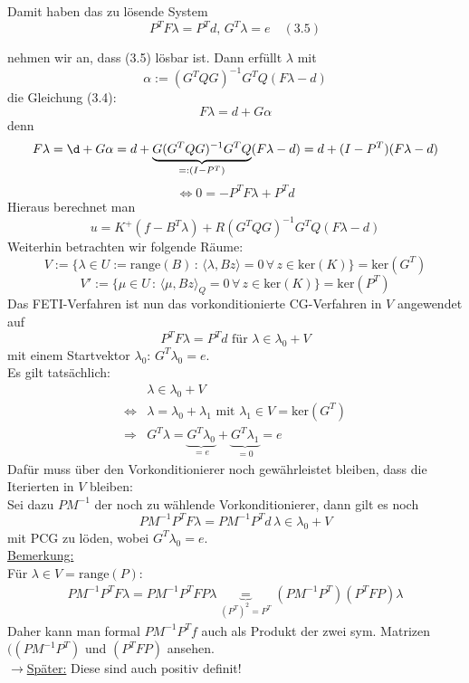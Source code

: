 

Damit haben das zu lösende System
\[ \boxed{P^TF\lambda =P^T d,\, G^T\lambda =e} \quad (3.5)  \]

nehmen wir an, dass (3.5) lösbar ist. Dann erfüllt $\lambda$ mit 
\[ \alpha := (G^TQG)^{-1} G^TQ (F\lambda -d) \]
die Gleichung (3.4):
\[ F\lambda = d+G\alpha \]
denn
\[ F\lambda = \d+G\alpha = d + \underbrace{G  (G^TQG)^{-1} G^TQ}_{=: (I-P^T)} (F\lambda -d) = d + (I-P^T)(F\lambda -d) \]
\[ \Leftrightarrow 0= -P^TF\lambda +P^Td \]
Hieraus berechnet man 
\[ u=K^+ (f-B^T\lambda) + R(G^T Q G)^{-1} G^TQ (F\lambda -d) \]
Weiterhin betrachten wir folgende Räume:
\[V:= \{ \lambda \in U :=\text{range} (B) \, :\,  \langle \lambda, Bz \rangle =0 \, \forall \, z \in \text{ker}(K) \} = \text{ker} (G^T) \]
\[V' := \{ \mu \in U \, :\,  \langle \mu, Bz \rangle_Q =0 \,  \forall \, z \in \text{ker}(K) \} = \text{ker} (P^T) \]
Das  FETI-Verfahren ist nun das vorkonditionierte CG-Verfahren in $V$ angewendet auf
\[ P^TF\lambda = P^T d \text{ für } \lambda \in \lambda_0 +V \]
mit einem Startvektor $\lambda_0: \, G^T\lambda_0=e $.\\
Es gilt tatsächlich:
\begin{align*}
&	\lambda \in \lambda_0 + V \\
\Leftrightarrow & \lambda=\lambda_0 + \lambda_1 \text{ mit } \lambda_1 \in V=\text{ker}(G^T) \\
\Rightarrow & G^T\lambda = \underbrace{G^T \lambda_0}_{=e} + \underbrace{G^T \lambda_1}_{=0} =e
\end{align*}
Dafür muss über den Vorkonditionierer noch gewährleistet bleiben, dass die Iterierten in $V$ bleiben:\\
Sei dazu $PM^{-1}$ der noch zu wählende Vorkonditionierer, dann gilt es noch
\[ PM^{-1}P^TF\lambda = PM^{-1} P^T d \, \lambda \in \lambda_0 + V \]
mit PCG zu löden, wobei $G^T\lambda_0 = e$.\\
\underline{Bemerkung:}\\
Für $\lambda \in V=\text{range} (P)$:
\begin{align*}
PM^{-1}P^TF\lambda = PM^{-1}P^T FP \lambda \underbrace{=}_{(P^T)^2=P^T} (PM^{-1}P^T)(P^TFP)\lambda
\end{align*}
Daher kann man formal $PM^{-1}P^Tf$ auch als Produkt der zwei sym. Matrizen $( (PM^{-1}P^T)$ und $(P^TFP)$ ansehen.\\
$\rightarrow$\underline{Später:} Diese sind auch positiv definit!\\
\\
